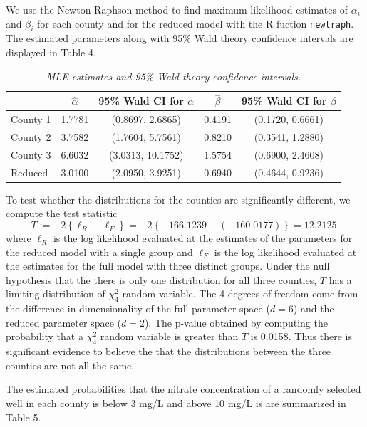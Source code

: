 \documentclass[12pt]{article}
\begin{document}
\begin{enumerate}
    We use the Newton-Raphson method to find maximum likelihood estimates of $\alpha_i$ and $\beta_i$ for each county and for the reduced model with the R fuction
    \texttt{newtraph}. The estimated parameters along with 95\% Wald theory confidence intervals are displayed in Table 4.

    \begin{table}[h]
      \caption{\emph{MLE estimates and 95\% Wald theory confidence intervals.}}
      \centering
      \begin{tabular}{|l|c|c|c|c|}
        \hline
        & $\hat{\alpha}$ & 95\% Wald CI for $\alpha$ & $\hat{\beta}$ & 95\% Wald CI for $\beta$ \\
        \hline 
        County 1 & 1.7781 & (0.8697, 2.6865) & 0.4191 & (0.1720, 0.6661) \\
        \hline
        County 2 & 3.7582 & (1.7604, 5.7561) & 0.8210 & (0.3541, 1.2880) \\
        \hline
        County 3 & 6.6032 & (3.0313, 10.1752) & 1.5754 & (0.6900, 2.4608) \\
        \hline
        Reduced & 3.0100 & (2.0950, 3.9251) & 0.6940 & (0.4644, 0.9236) \\
        \hline
      \end{tabular}
    \end{table}

    To test whether the distributions for the counties are significantly different, we compute the test statistic
    \[
      T := -2\left\{ \ell_{R} - \ell_{F} \right\} = -2\left\{ -166.1239 - (-160.0177) \right\} = 12.2125.
    \]
    where $\ell_{R}$ is the log likelihood evaluated at the estimates of the parameters for the reduced model with a single group and $\ell_{F}$ is
    the log likelihood evaluated at the estimates for the full model with three distinct groups. Under the null hypothesis that the there is only one
    distribution for all three counties, $T$ has a limiting distribution of $\chi_{4}^{2}$ random variable. The 4 degrees of freedom come from the
    difference in dimensionality of the full parameter space ($d = 6$) and the reduced parameter space ($d = 2$). The p-value obtained by computing
    the probability that a $\chi_{4}^{2}$ random variable is greater than $T$ is 0.0158. Thus there is significant evidence to believe the that the
    distributions between the three counties are not all the same.

    The estimated probabilities that the nitrate concentration of a randomly selected well in each county is below 3 mg/L and above 10 mg/L is are
    summarized in Table 5.


\end{enumerate}
\end{document}
